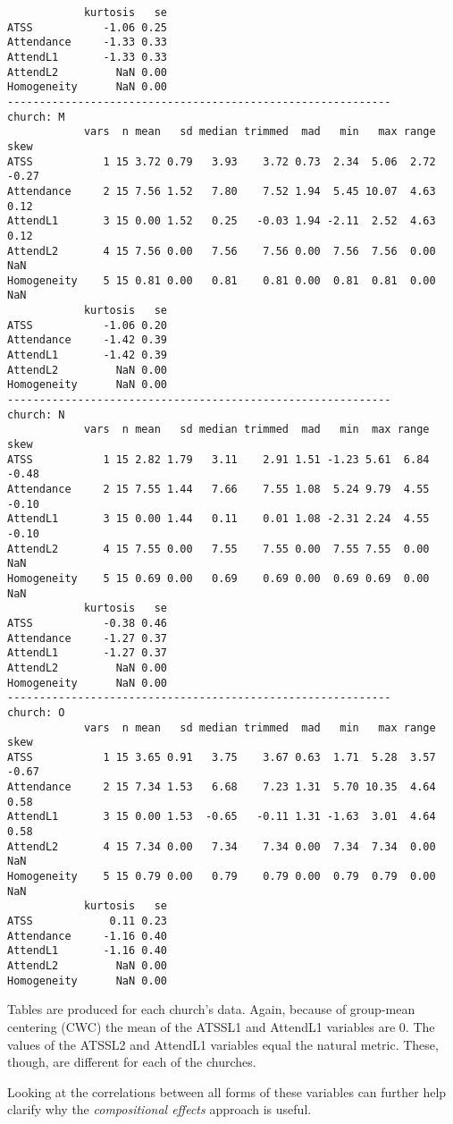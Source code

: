 \documentclass[
  11pt,
]{book}
\begin{document}
\begin{verbatim}
            kurtosis   se
ATSS           -1.06 0.25
Attendance     -1.33 0.33
AttendL1       -1.33 0.33
AttendL2         NaN 0.00
Homogeneity      NaN 0.00
------------------------------------------------------------ 
church: M
            vars  n mean   sd median trimmed  mad   min   max range  skew
ATSS           1 15 3.72 0.79   3.93    3.72 0.73  2.34  5.06  2.72 -0.27
Attendance     2 15 7.56 1.52   7.80    7.52 1.94  5.45 10.07  4.63  0.12
AttendL1       3 15 0.00 1.52   0.25   -0.03 1.94 -2.11  2.52  4.63  0.12
AttendL2       4 15 7.56 0.00   7.56    7.56 0.00  7.56  7.56  0.00   NaN
Homogeneity    5 15 0.81 0.00   0.81    0.81 0.00  0.81  0.81  0.00   NaN
            kurtosis   se
ATSS           -1.06 0.20
Attendance     -1.42 0.39
AttendL1       -1.42 0.39
AttendL2         NaN 0.00
Homogeneity      NaN 0.00
------------------------------------------------------------ 
church: N
            vars  n mean   sd median trimmed  mad   min  max range  skew
ATSS           1 15 2.82 1.79   3.11    2.91 1.51 -1.23 5.61  6.84 -0.48
Attendance     2 15 7.55 1.44   7.66    7.55 1.08  5.24 9.79  4.55 -0.10
AttendL1       3 15 0.00 1.44   0.11    0.01 1.08 -2.31 2.24  4.55 -0.10
AttendL2       4 15 7.55 0.00   7.55    7.55 0.00  7.55 7.55  0.00   NaN
Homogeneity    5 15 0.69 0.00   0.69    0.69 0.00  0.69 0.69  0.00   NaN
            kurtosis   se
ATSS           -0.38 0.46
Attendance     -1.27 0.37
AttendL1       -1.27 0.37
AttendL2         NaN 0.00
Homogeneity      NaN 0.00
------------------------------------------------------------ 
church: O
            vars  n mean   sd median trimmed  mad   min   max range  skew
ATSS           1 15 3.65 0.91   3.75    3.67 0.63  1.71  5.28  3.57 -0.67
Attendance     2 15 7.34 1.53   6.68    7.23 1.31  5.70 10.35  4.64  0.58
AttendL1       3 15 0.00 1.53  -0.65   -0.11 1.31 -1.63  3.01  4.64  0.58
AttendL2       4 15 7.34 0.00   7.34    7.34 0.00  7.34  7.34  0.00   NaN
Homogeneity    5 15 0.79 0.00   0.79    0.79 0.00  0.79  0.79  0.00   NaN
            kurtosis   se
ATSS            0.11 0.23
Attendance     -1.16 0.40
AttendL1       -1.16 0.40
AttendL2         NaN 0.00
Homogeneity      NaN 0.00
\end{verbatim}

Tables are produced for each church's data. Again, because of group-mean centering (CWC) the mean of the ATSSL1 and AttendL1 variables are 0. The values of the ATSSL2 and AttendL1 variables equal the natural metric. These, though, are different for each of the churches.

Looking at the correlations between all forms of these variables can further help clarify why the \emph{compositional effects} approach is useful.
\end{document}
